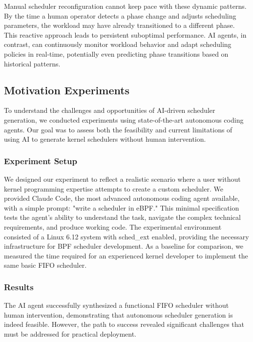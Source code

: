 Manual scheduler reconfiguration cannot keep pace with these dynamic patterns. By the time a human operator detects a phase change and adjusts scheduling parameters, the workload may have already transitioned to a different phase. This reactive approach leads to persistent suboptimal performance. AI agents, in contrast, can continuously monitor workload behavior and adapt scheduling policies in real-time, potentially even predicting phase transitions based on historical patterns.

\subsection{Motivation Experiments}

To understand the challenges and opportunities of AI-driven scheduler generation, we conducted experiments using state-of-the-art autonomous coding agents. Our goal was to assess both the feasibility and current limitations of using AI to generate kernel schedulers without human intervention.

\subsubsection{Experiment Setup}

We designed our experiment to reflect a realistic scenario where a user without kernel programming expertise attempts to create a custom scheduler. We provided Claude Code, the most advanced autonomous coding agent available, with a simple prompt: "write a scheduler in eBPF." This minimal specification tests the agent's ability to understand the task, navigate the complex technical requirements, and produce working code. The experimental environment consisted of a Linux 6.12 system with sched\_ext enabled, providing the necessary infrastructure for BPF scheduler development. As a baseline for comparison, we measured the time required for an experienced kernel developer to implement the same basic FIFO scheduler.

\subsubsection{Results}

The AI agent successfully synthesized a functional FIFO scheduler without human intervention, demonstrating that autonomous scheduler generation is indeed feasible. However, the path to success revealed significant challenges that must be addressed for practical deployment.

